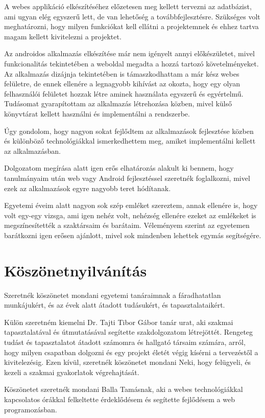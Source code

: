 \documentclass[
]{thesis-ekf}
\theoremstyle{definition}
\theoremstyle{remark}
\begin{document}
	A webes applikáció elkészítéséhez előzetesen meg kellett tervezni az adatbázist, ami ugyan elég egyszerű lett, de van lehetőség a továbbfejlesztésre. Szükséges volt meghatározni, hogy milyen funkciókat kell ellátni a projektemnek és ehhez tartva magam kellett kivitelezni a projektet. 
	
	Az androidos alkalmazás elkészítése már nem igényelt annyi előkészületet, mivel funkcionalitás tekintetében a weboldal megadta a hozzá tartozó követelményeket. Az alkalmazás dizájnja tekintetében is támaszkodhattam a már kész webes felületre, de ennek ellenére a legnagyobb kihívást az okozta, hogy egy olyan felhasználói felületet hozzak létre aminek használata egyszerű és egyértelmű. Tudásomat gyarapítottam az alkalmazás létrehozása közben, mivel külső könyvtárat kellett használni és implementálni a rendszerbe.
	
	Úgy gondolom, hogy nagyon sokat fejlődtem az alkalmazások fejlesztése közben és különböző technológiákkal ismerkedhettem meg, amiket implementálni kellett az alkalmazásban. 
	
	Dolgozatom megírása alatt igen erős elhatározás alakult ki bennem, hogy tanulmányaim után web vagy Android fejlesztéssel szeretnék foglalkozni, mivel ezek az alkalmazások egyre nagyobb teret hódítanak. 
	
	Egyetemi éveim alatt nagyon sok szép emléket szereztem, annak ellenére is, hogy volt egy-egy vizsga, ami igen nehéz volt, nehézség ellenére ezeket az emlékeket is megszínesítették a szaktársaim és barátaim. Véleményem szerint az egyetemen barátkozni igen erősen ajánlott, mivel sok mindenben lehettek egymás segítségére. 
	
	\chapter{Köszönetnyilvánítás}
	Szeretnék köszönetet mondani egyetemi tanáraimnak a fáradhatatlan munkájukért, és az évek alatt átadott tudásukért, és tapasztalataikért. 
	
	Külön szeretném kiemelni Dr. Tajti Tibor Gábor tanár urat, aki szakmai tapasztalatával és útmutatásával segítette szakdolgozatom létrejöttét. Rengeteg tudást és tapasztalatot átadott számomra és hallgató társaim számára, arról, hogy milyen csapatban dolgozni és egy projekt életét végig kísérni a tervezéstől a kivitelezésig. Ezen kívül, szeretnék köszönetet mondani Neki, hogy felügyeli, és kezeli a szakmai gyakorlatok végrehajtását. 
	
	Köszönetet szeretnék mondani Balla Tamásnak, aki a webes technológiákkal kapcsolatos órákkal felkeltette érdeklődésem és segítette fejlődésem a web programozásban.
	
\end{document}
